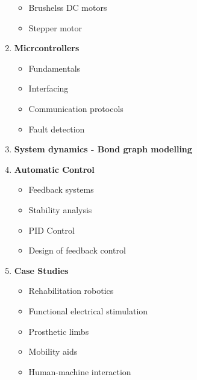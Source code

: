 \begin{enumerate}
\begin{itemize}
        \item Brushelss DC motors
        \item Stepper motor
    \end{itemize}
    \item \textbf{Micrcontrollers}
    \begin{itemize}
        \item Fundamentals
        \item Interfacing
        \item Communication protocols
        \item Fault detection
    \end{itemize}
    \item \textbf{System dynamics - Bond graph modelling}
    \item \textbf{Automatic Control}
    \begin{itemize}
        \item Feedback systems
        \item Stability analysis
        \item PID Control
        \item Design of feedback control
    \end{itemize}
    \item \textbf{Case Studies}
    \begin{itemize}
        \item Rehabilitation robotics
        \
        \item Functional electrical stimulation
        \item Prosthetic limbs
        \item Mobility aids
        \item Human-machine interaction
    \end{itemize}
\end{enumerate}
